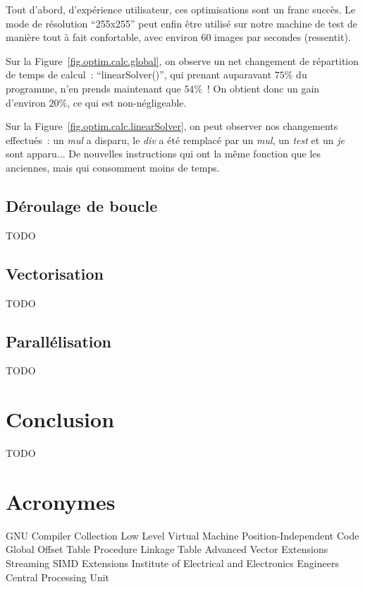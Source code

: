 \documentclass[12pt,a4paper]{article}
\begin{document}
Tout d’abord, d’expérience utilisateur, ces optimisations sont un franc succès.
Le mode de résolution \enquote{255x255} peut enfin être utilisé sur
notre machine de test de manière tout à fait confortable, avec environ 60 images
par secondes (ressentit).

Sur la Figure~\ref{fig.optim.calc.global}, on observe un net changement de
répartition de temps de calcul : \enquote{linearSolver()}, qui prenant
auparavant $75\%$ du programme, n’en prends maintenant que $54\%$ ! On obtient
donc un gain d’environ $20\%$, ce qui est non-négligeable.

Sur la Figure~\ref{fig.optim.calc.linearSolver}, on peut observer nos
changements effectués : un \textit{mul} a disparu, le \textit{div} a été
remplacé par un \textit{mul}, un \textit{test} et un \textit{je} sont apparu...
De nouvelles instructions qui ont la même fonction que les anciennes, mais qui
consomment moins de temps.

\subsection{Déroulage de boucle}
\label{sub.optim.unrol}

TODO

\subsection{Vectorisation}
\label{sub.optim.vec}

TODO

\subsection{Parallélisation}
\label{sub.optim.parall}

TODO

\section{Conclusion}
\label{sec.conc}

TODO

\newpage
\section*{Acronymes}
\label{sec.acro}

\begin{acronym}
      {GNU Compiler Collection}
     {Low Level Virtual Machine}
      {Position-Independent Code}
      {Global Offset Table}
      {Procedure Linkage Table}
      {Advanced Vector Extensions}
      {Streaming SIMD Extensions}
     {Institute of Electrical and Electronics Engineers}
      {Central Processing Unit}
\end{acronym}
\end{document}
